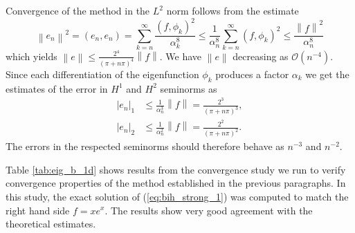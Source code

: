 \documentclass[a4paper,10pt]{article}
\newcommand{\norm}[1]{\ensuremath{\left\|#1\right\|}}
\newcommand{\seminorm}[1]{\ensuremath{\left|#1\right|}}
\newcommand{\inner}[2]{\ensuremath{\left(#1, #2\right)}}
\begin{document}
  Convergence of the method in the $L^2$ norm follows from the estimate
  \[
    \norm{e_n}^2=\inner{e_n}{e_n} = \sum_{k=n}^{\infty}\frac{\inner{f}{\phi_k}^2}{\alpha^8_k} \leq
      \frac{1}{\alpha^8_n}\sum_{k=n}^{\infty} (f, \phi_k)^2 \leq
      \frac{\norm{f}^2}{\alpha^8_n}
  \]
  which yields $\norm{e}\leq\frac{2^4}{\left(\pi + n\pi\right)^4}\norm{f}$.
  We have $\norm{e}$ decreasing as $\mathcal{O}(n^{-4})$. Since each
  differentiation of the eigenfunction  $\phi_k$ produces a factor $\alpha_k$
  we get the estimates of the error in 
  $H^1$ and $H^2$ seminorms as
  \begin{align*}
    \seminorm{e_n}_1 &\leq \frac{1}{\alpha^3_n}\norm{f} = \frac{2^3}{\left(\pi + n\pi\right)^3}, \\
    \seminorm{e_n}_2 &\leq \frac{1}{\alpha^2_n}\norm{f} = \frac{2^2}{\left(\pi + n\pi\right)^2}.
  \end{align*}
  The errors in the respected seminorms should therefore behave as
  $n^{-3}$ and $n^{-2}$.
    
  Table \ref{tab:eig_b_1d} shows results from the convergence study we run to
  verify convergence properties of the method established in the previous
  paragraphs. In this study, the exact solution of (\ref{eq:bih_strong_1}) was
  computed to match the right hand side $f=x e^x$. The results show very good
  agreement with the theoretical estimates.
\end{document}

